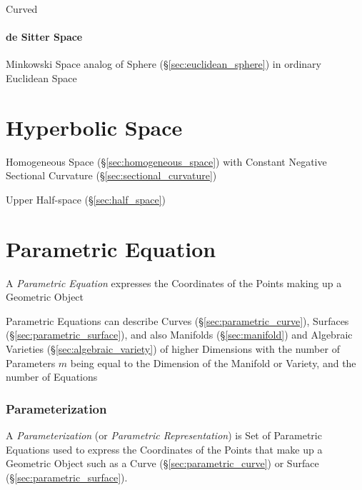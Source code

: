 Curved



\paragraph{de Sitter Space}\label{sec:desitter_space}\hfill

Minkowski Space analog of Sphere (\S\ref{sec:euclidean_sphere}) in ordinary
Euclidean Space



\section{Hyperbolic Space}\label{sec:hyperbolic_space}

Homogeneous Space (\S\ref{sec:homogeneous_space}) with Constant Negative
Sectional Curvature (\S\ref{sec:sectional_curvature})

Upper Half-space (\S\ref{sec:half_space})



\section{Parametric Equation}\label{sec:parametric_equation}

A \emph{Parametric Equation} expresses the Coordinates of the Points making up a
Geometric Object

Parametric Equations can describe Curves (\S\ref{sec:parametric_curve}),
Surfaces (\S\ref{sec:parametric_surface}), and also Manifolds
(\S\ref{sec:manifold}) and Algebraic Varieties (\S\ref{sec:algebraic_variety})
of higher Dimensions with the number of Parameters $m$ being equal to the
Dimension of the Manifold or Variety, and the number of Equations



\subsubsection{Parameterization}\label{sec:parameterization}

A \emph{Parameterization} (or \emph{Parametric Representation}) is Set of
Parametric Equations used to express the Coordinates of the Points that make up
a Geometric Object such as a Curve (\S\ref{sec:parametric_curve}) or Surface
(\S\ref{sec:parametric_surface}).


